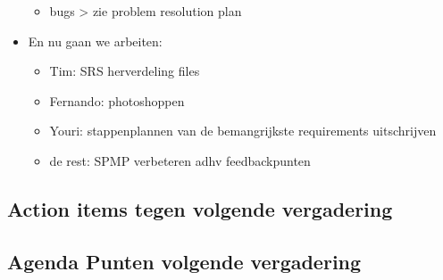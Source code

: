 \begin{itemize}
\begin{itemize}
	\item bugs > zie problem resolution plan
	\end{itemize}
\item En nu gaan we arbeiten:
	\begin{itemize}
	\item Tim: SRS herverdeling files
	\item Fernando: photoshoppen
	\item Youri: stappenplannen van de bemangrijkste requirements uitschrijven
	\item de rest: SPMP verbeteren adhv feedbackpunten
	\end{itemize}
\end{itemize}

\subsection{Action items tegen volgende vergadering}
\subsection{Agenda Punten volgende vergadering}

